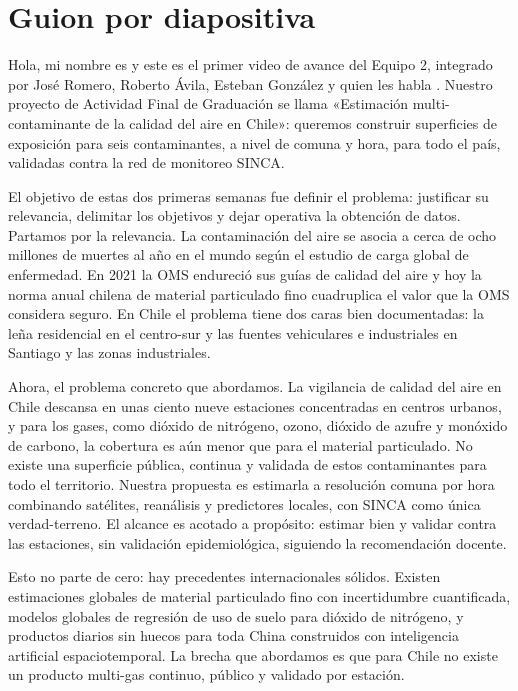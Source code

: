 \section{Guion por diapositiva}

 Hola, mi nombre es  y este es el primer video de avance del Equipo 2, integrado por José Romero, Roberto Ávila, Esteban González y quien les habla . Nuestro proyecto de Actividad Final de Graduación se llama «Estimación multi-contaminante de la calidad del aire en Chile»: queremos construir superficies de exposición para seis contaminantes, a nivel de comuna y hora, para todo el país, validadas contra la red de monitoreo SINCA.

 El objetivo de estas dos primeras semanas fue definir el problema: justificar su relevancia, delimitar los objetivos y dejar operativa la obtención de datos. Partamos por la relevancia. La contaminación del aire se asocia a cerca de ocho millones de muertes al año en el mundo según el estudio de carga global de enfermedad. En 2021 la OMS endureció sus guías de calidad del aire y hoy la norma anual chilena de material particulado fino cuadruplica el valor que la OMS considera seguro. En Chile el problema tiene dos caras bien documentadas: la leña residencial en el centro-sur y las fuentes vehiculares e industriales en Santiago y las zonas industriales.

 Ahora, el problema concreto que abordamos. La vigilancia de calidad del aire en Chile descansa en unas ciento nueve estaciones concentradas en centros urbanos, y para los gases, como dióxido de nitrógeno, ozono, dióxido de azufre y monóxido de carbono, la cobertura es aún menor que para el material particulado. No existe una superficie pública, continua y validada de estos contaminantes para todo el territorio. Nuestra propuesta es estimarla a resolución comuna por hora combinando satélites, reanálisis y predictores locales, con SINCA como única verdad-terreno. El alcance es acotado a propósito: estimar bien y validar contra las estaciones, sin validación epidemiológica, siguiendo la recomendación docente.

Esto no parte de cero: hay precedentes internacionales sólidos. Existen estimaciones globales de material particulado fino con incertidumbre cuantificada, modelos globales de regresión de uso de suelo para dióxido de nitrógeno, y productos diarios sin huecos para toda China construidos con inteligencia artificial espaciotemporal. La brecha que abordamos es que para Chile no existe un producto multi-gas continuo, público y validado por estación.

